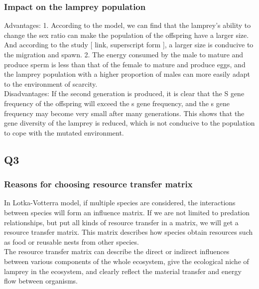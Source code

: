 \documentclass[12pt]{article}
\begin{document}
\subsubsection{Impact on the lamprey population }
Advantages: 1. According to the model, we can find that the lamprey's ability to change 
the sex ratio can make the population of the offspring have a larger size. And according 
to the study [ link, superscript form ], a larger size is conducive to the migration and 
spawn. 2. The energy consumed by the male to mature and produce sperm is less than that of 
the female to mature and produce eggs, and the lamprey population with a higher proportion of 
males can more easily adapt to the environment of scarcity.\\
Disadvantages: If the second generation is produced, it is clear that the S gene frequency 
of the offspring will exceed the s gene frequency, and the s gene frequency may become 
very small after many generations. This shows that the gene diversity of the lamprey 
is reduced, which is not conducive to the population to cope with the mutated environment. 
\subsection{Q3}
\subsubsection{Reasons for choosing resource transfer matrix}
In Lotka-Votterra model, if multiple species are considered, the interactions between species 
will form an influence matrix. If we are not limited to predation relationships, but put all 
kinds of resource transfer in a matrix, we will get a resource transfer matrix. This matrix 
describes how species obtain resources such as food or reusable nests from other species.\\
The resource transfer matrix can describe the direct or indirect influences between various 
components of the whole ecosystem, give the ecological niche of lamprey in the ecosystem, 
and clearly reflect the material transfer and energy flow between organisms. 
\end{document}
